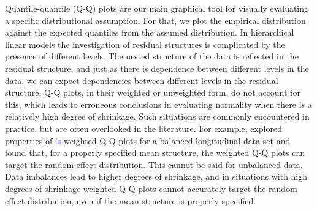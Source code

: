 \documentclass[12pt]{article} %
\newcommand{\citetapos}[1]{\citeauthor{#1}{\textcolor{blue}{'s}} }
\newcommand{\hh}[1]{{\color{orange} #1}}
\newcommand{\al}[1]{{\color{red} #1}}
\begin{document}

Quantile-quantile (Q-Q) plots \citep{Wilk:1968} are our main graphical tool for  visually evaluating a specific distributional assumption. For that, we plot the empirical distribution against the expected quantiles from the assumed distribution. 
In hierarchical linear models the investigation of residual structures is complicated by the presence of  different levels. 
The nested structure of the data is reflected in the residual structure, and just as there is dependence between different levels in the data, we can expect dependencies between different levels in the residual structure. 
Q-Q plots, in their weighted \citep{Dempster:1985tr, Lange:1989uu} or unweighted {form}, do not account for this, which leads to erroneous conclusions in evaluating normality when there is a relatively high degree of shrinkage. Such situations are commonly encountered in practice, but are often overlooked in the literature. For example, \cite{Eberly:2005ee} explored properties of \citetapos{Lange:1989uu} weighted Q-Q plots for a balanced longitudinal data set and found that, for a properly specified mean structure, the weighted Q-Q plots can target the random effect distribution. This cannot be said for unbalanced data. Data imbalances lead to higher degrees of shrinkage, and in situations with high degrees of shrinkage weighted Q-Q plots  cannot accurately target the random effect distribution, even if the mean structure is properly specified.
\end{document}
